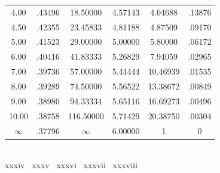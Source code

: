 \begin{minipage}{0.49\textwidth}
\begin{tabular}{c|c|c|c|c|c}
        4.00 & .43496 & 18.50000 & 4.57143 & 4.04688 & .13876 \\
        4.50 & .42355 & 23.45833 & 4.81188 & 4.87509 & .09170 \\
        5.00 & .41523 & 29.00000 & 5.00000 & 5.80000 & .06172 \\  \arrayrulecolor{Orange}\hline\arrayrulecolor{black}
        6.00 & .40416 & 41.83333 & 5.26829 & 7.94059 & .02965 \\
        7.00 & .39736 & 57.00000 & 5.44444 & 10.46939 & .01535 \\
        8.00 & .39289 & 74.50000 & 5.56522 & 13.38672 & .00849 \\
        9.00 & .38980 & 94.33334 & 5.65116 & 16.69273 & .00496 \\
        10.00 & .38758 & 116.50000 & 5.71429 & 20.38750 & .00304 \\
        $\infty$ & .37796 & $\infty$ & 6.00000 & 1 & 0 \\
    \end{tabular}%
    \vspace{4.25mm}
\end{minipage} \\ \vspace{4mm}
{\color{Blue}xxxiv} \textbar\ {\color{Red}xxxv} \textbar\ {\color{Green}xxxvi} \textbar\ {\color{Plum}xxxvii} \textbar\ {\color{Orange}xxxviii}